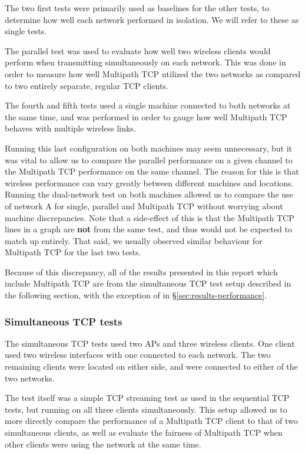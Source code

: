 The two first tests were primarily used as baselines for the other tests, to determine
how well each network performed in isolation. We will refer to these as single tests.

The parallel test was used to evaluate how well two wireless clients would perform
when transmitting simultaneously on each network. This was done in order to
measure how well Multipath TCP utilized the two networks as compared to two
entirely separate, regular TCP clients.

The fourth and fifth tests used a single machine connected to both networks at
the same time, and was performed in order to gauge how well Multipath TCP behaves
with multiple wireless links.

Running this last configuration on both machines may seem unnecessary,
but it was vital to allow us to compare the parallel performance on a
given channel to the Multipath TCP performance on the same channel. The reason
for this is that wireless performance can vary greatly between different machines and
locations. Running the dual-network test on both machines allowed us to compare
the use of network A for single, parallel and Multipath TCP without worrying
about machine discrepancies. Note that a side-effect of this is that the
Multipath TCP lines in a graph are \textbf{not} from the same test, and thus
would not be expected to match up entirely. That said, we usually observed
similar behaviour for Multipath TCP for the last two tests.

Because of this discrepancy, all of the results presented in this report which
include Multipath TCP are
from the simultaneous TCP test setup described in the following section, with
the exception of in \S\ref{sec:results-performance}.

\subsubsection{Simultaneous TCP tests}
\label{sec:met:setups:simtcp}
The simultaneous TCP tests used two APs and three
wireless clients. One client used two wireless interfaces with one
connected to each network. The two remaining clients were located on either side, and were connected to either of the two networks.

The test itself was a simple TCP streaming test as used in the sequential TCP
tests, but running on all three clients simultaneously. This setup allowed
us to more directly compare the performance of a Multipath TCP client to that of
two simultaneous clients, as well as evaluate the fairness of Multipath TCP when
other clients were using the network at the same time.

